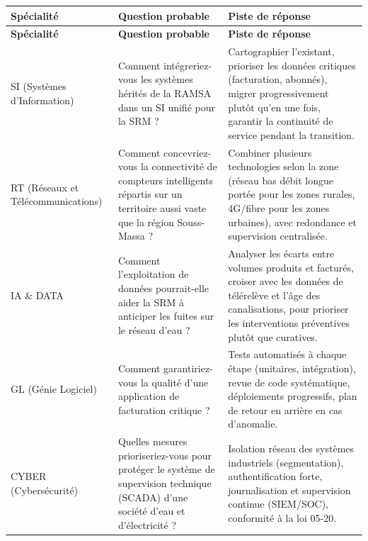 {\small
\begin{longtable}{|>{\raggedright\arraybackslash\hspace{0pt}}p{2.6cm}|>{\raggedright\arraybackslash\hspace{0pt}}p{5.0cm}|>{\raggedright\arraybackslash\hspace{0pt}}p{6.4cm}|}
\hline
\rowcolor{gray!20} \textbf{Spécialité} & \textbf{Question probable} & \textbf{Piste de réponse} \\ \hline
\endfirsthead
\hline
\rowcolor{gray!20} \textbf{Spécialité} & \textbf{Question probable} & \textbf{Piste de réponse} \\ \hline
\endhead

SI (Systèmes d'Information) & Comment intégreriez-vous les systèmes hérités de la RAMSA dans un SI unifié pour la SRM ? & Cartographier l'existant, prioriser les données critiques (facturation, abonnés), migrer progressivement plutôt qu'en une fois, garantir la continuité de service pendant la transition. \\ \hline

RT (Réseaux et Télécommunications) & Comment concevriez-vous la connectivité de compteurs intelligents répartis sur un territoire aussi vaste que la région Souss-Massa ? & Combiner plusieurs technologies selon la zone (réseau bas débit longue portée pour les zones rurales, 4G/fibre pour les zones urbaines), avec redondance et supervision centralisée. \\ \hline

IA \& DATA & Comment l'exploitation de données pourrait-elle aider la SRM à anticiper les fuites sur le réseau d'eau ? & Analyser les écarts entre volumes produits et facturés, croiser avec les données de télérelève et l'âge des canalisations, pour prioriser les interventions préventives plutôt que curatives. \\ \hline

GL (Génie Logiciel) & Comment garantiriez-vous la qualité d'une application de facturation critique ? & Tests automatisés à chaque étape (unitaires, intégration), revue de code systématique, déploiements progressifs, plan de retour en arrière en cas d'anomalie. \\ \hline

CYBER (Cybersécurité) & Quelles mesures prioriseriez-vous pour protéger le système de supervision technique (SCADA) d'une société d'eau et d'électricité ? & Isolation réseau des systèmes industriels (segmentation), authentification forte, journalisation et supervision continue (SIEM/SOC), conformité à la loi 05-20. \\ \hline

\end{longtable}
}

